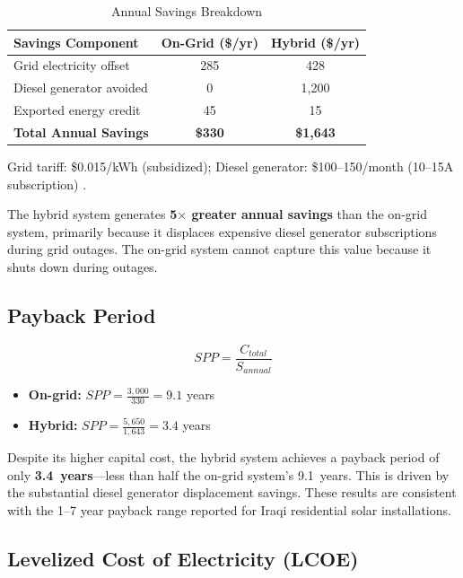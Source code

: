 \begin{table}[H]
\centering
\caption{Annual Savings Breakdown}
\label{tab:savings}
\small
\begin{tabular}{@{}p{5cm} c c@{}}
\toprule
\textbf{Savings Component} & \textbf{On-Grid (\$/yr)} & \textbf{Hybrid (\$/yr)} \\
\midrule
Grid electricity offset & 285 & 428 \\
Diesel generator avoided & 0 & 1,200 \\
Exported energy credit & 45 & 15 \\
\midrule
\textbf{Total Annual Savings} & \textbf{\$330} & \textbf{\$1,643} \\
\bottomrule
\end{tabular}
\begin{flushleft}
\small Grid tariff: \$0.015/kWh (subsidized); Diesel generator: \$100--150/month (10--15A subscription) \cite{rudaw2024}.
\end{flushleft}
\end{table}

The hybrid system generates \textbf{5$\times$ greater annual savings} than the on-grid system, primarily because it displaces expensive diesel generator subscriptions during grid outages. The on-grid system cannot capture this value because it shuts down during outages.


\subsection{Payback Period}

\begin{equation}
    SPP = \frac{C_{total}}{S_{annual}}
\end{equation}

\begin{itemize}
    \item \textbf{On-grid:} $SPP = \frac{3{,}000}{330} = 9.1$ years
    \item \textbf{Hybrid:} $SPP = \frac{5{,}650}{1{,}643} = 3.4$ years
\end{itemize}

Despite its higher capital cost, the hybrid system achieves a payback period of only \textbf{3.4~years}---less than half the on-grid system's 9.1~years. This is driven by the substantial diesel generator displacement savings. These results are consistent with the 1--7 year payback range reported for Iraqi residential solar installations.


\subsection{Levelized Cost of Electricity (LCOE)}

